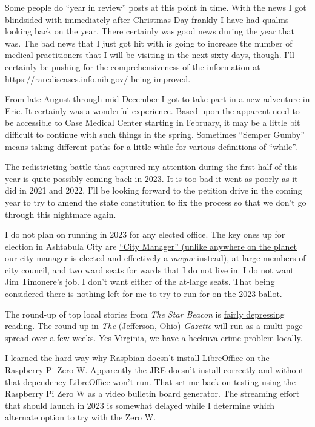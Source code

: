 Some people do ``year in review'' posts at this point in time. With the
news I got blindsided with immediately after Christmas Day frankly I
have had qualms looking back on the year. There certainly was good news
during the year that was. The bad news that I just got hit with is going
to increase the number of medical practitioners that I will be visiting
in the next sixty days, though. I'll certainly be pushing for the
comprehensiveness of the information at
\url{https://rarediseases.info.nih.gov/} being improved.

From late August through mid-December I got to take part in a new
adventure in Erie. It certainly was a wonderful experience. Based upon
the apparent need to be accessible to Case Medical Center starting in
February, it may be a little bit difficult to continue with such things
in the spring. Sometimes
\href{https://en.wikipedia.org/w/index.php?title=Semper_Gumby&oldid=1117469063}{``Semper
Gumby''} means taking different paths for a little while for various
definitions of ``while''.

The redistricting battle that captured my attention during the first
half of this year is quite possibly coming back in 2023. It is too bad
it went as poorly as it did in 2021 and 2022. I'll be looking forward to
the petition drive in the coming year to try to amend the state
constitution to fix the process so that we don't go through this
nightmare again.

I do not plan on running in 2023 for any elected office. The key ones up
for election in Ashtabula City are
\href{http://web.archive.org/web/20220813134214/https://www.cityofashtabula.com/city-manager}{``City
Manager'' (unlike anywhere on the planet our city manager is elected and
effectively a \emph{mayor} instead)}, at-large members of city council,
and two ward seats for wards that I do not live in. I do not want Jim
Timonere's job. I don't want either of the at-large seats. That being
considered there is nothing left for me to try to run for on the 2023
ballot.

The round-up of top local stories from \emph{The Star Beacon} is
\href{http://web.archive.org/web/20230101021130/https://www.starbeacon.com/news/local_news/ashtabula-countys-top-stories-of-2022/article_875b4f0c-82eb-11ed-b584-0b15e4df0d86.html}{fairly
depressing reading}. The round-up in \emph{The} (Jefferson, Ohio)
\emph{Gazette} will run as a multi-page spread over a few weeks. Yes
Virginia, we have a heckuva crime problem locally.

I learned the hard way why Raspbian doesn't install LibreOffice on the
Raspberry Pi Zero W. Apparently the JRE doesn't install correctly and
without that dependency LibreOffice won't run. That set me back on
testing using the Raspberry Pi Zero W as a video bulletin board
generator. The streaming effort that should launch in 2023 is somewhat
delayed while I determine which alternate option to try with the Zero W.

